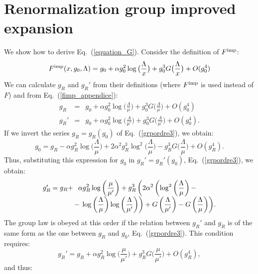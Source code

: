 \documentclass[floatfix,twocolumn,preprintnumbers,amsmath,amssymb,prb]{revtex4}
\newcommand{\be}{\begin{equation}}
\newcommand{\ee}{\end{equation}}
\begin{document}
{{\section{Renormalization group improved expansion}
We show how to derive Eq.~(\ref{equation_G}).
Consider the definition of $F^{\rm imp}$:
\begin{equation}
F^{\rm imp}(x,g_0,\Lambda)=g_0 + \alpha g_0^2
\log\big(\frac{\Lambda}{x}\big) + g_0^3
G\big(\frac{\Lambda}{x}\big)+ O(g_0^4)
\label{fimp_appendice}
\end{equation}
We can calculate $g_R$ and $g_R'$ from their definitions (where
$F^{\rm imp}$ is used instead of $F$) and from
Eq.~(\ref{fimp_appendice}):
\begin{eqnarray}
g_R&=&g_0 +\alpha g_0^2 \log\big(\frac{\Lambda}{\mu}\big) +
g_0^3 G\big(\frac{\Lambda}{\mu}\big)+ O(g_0^4)\\
g_R'&=&g_0 +\alpha g_0^2 \log\big(\frac{\Lambda}{\mu'}\big) +
g_0^3 G\big(\frac{\Lambda}{\mu'}\big) + O(g_0^4).
\label{grpordre3}
\end{eqnarray}
If we invert the series $g_R=g_R(g_0)$ of Eq.~(\ref{grpordre3}), we
obtain:
\begin{equation}
g_0=g_R-\alpha g_R^2\log\big(\frac{\Lambda}{\mu}\big)+ 2
\alpha^2 g_R^3 \log^2\big(\frac{\Lambda}{\mu}\big)
- g_R^3 G\big(\frac{\Lambda}{\mu}\big)
+O(g_R^4).
\end{equation}
Thus, substituting this expression for $g_0$ in $g_R'=g_R'(g_0)$,
Eq.~(\ref{grpordre3}), we obtain:
\be
\begin{array}{ll}
g_R'=g_R  +&\displaystyle{\hspace{-0.1cm}\alpha g_R^2 \log\left(\frac{\mu}{\mu'}\right) + 
g_R^3\left( 2\alpha^2\left( \log^2\left(\frac{\Lambda}{\mu}\right)-\right.\right.} \\
&\hspace{-0.3cm}\displaystyle{-\left.\left.\log\left(\frac{\Lambda}{\mu} \right)\log\left(\frac{\Lambda}{\mu'}\right)\right) + G\left(\frac{\Lambda}{\mu'}\right)- 
G\left(\frac{\Lambda}{\mu}\right) \right)}.
\end{array}
\ee
The group law is obeyed at this order if the relation between
$g_R'$ and $g_R$ is of the same form as the one between
$g_R$ and $g_0$, Eq.~(\ref{grpordre3}). This condition requires:
\begin{equation}
g_R'=g_R +\alpha g_R^2 \log\big(\frac{\mu}{\mu'}\big) + g_R^3
G\big(\frac{\mu}{\mu'}\big)+ O(g_R^4),
\end{equation}
and thus:
\begin{equation}

\end{equation}}}
\end{document}
